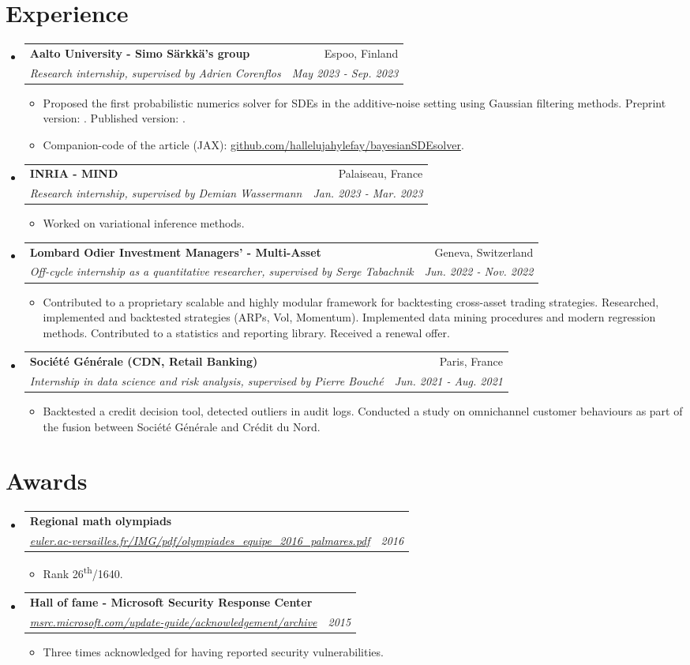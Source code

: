 \documentclass[letterpaper,10pt]{article}
\makeatletter
\newcommand{\up}[1]{\textsuperscript{#1}}
\newcommand{\resumeItem}[1]{
    \item\small{
            {#1 \vspace{-2pt}}
    }
}
\newcommand{\resumeSubheading}[4]{
    \vspace{-2pt}\item
    \begin{tabular*}{0.97\textwidth}[t]{l@{\extracolsep{\fill}}r}
        \textbf{#1}       & #2                 \\
        \textit{\small#3} & \textit{\small #4} \\
    \end{tabular*}\vspace{-7pt}
}
\newcommand{\resumeSubHeadingListStart}{\begin{itemize}[leftmargin=0.15in, label={}]}
\newcommand{\resumeSubHeadingListEnd}{\end{itemize}}
\newcommand{\resumeItemListStart}{\begin{itemize}}
\newcommand{\resumeItemListEnd}{\end{itemize}\vspace{-5pt}}
\makeatother
\begin{document}
\section{Experience}
\resumeSubHeadingListStart
\resumeSubheading
{Aalto University - Simo Särkkä's group}{Espoo, Finland}
{Research internship, supervised by Adrien Corenflos}{May 2023 - Sep. 2023}
\resumeItemListStart
\resumeItem{Proposed the first probabilistic numerics solver for SDEs in the additive-noise setting using Gaussian filtering methods. Preprint version: . Published version: .}
\resumeItem{Companion-code of the article (JAX): \href{https://github.com/hallelujahylefay/bayesianSDEsolver}{github.com/hallelujahylefay/bayesianSDEsolver}.}
\resumeItemListEnd
\resumeSubheading
{INRIA - MIND}{Palaiseau, France}
{Research internship, supervised by Demian Wassermann}{Jan. 2023 - Mar. 2023}
\resumeItemListStart
\resumeItem{Worked on variational inference methods.}
\resumeItemListEnd
\resumeSubheading
{Lombard Odier Investment Managers' - Multi-Asset}{Geneva, Switzerland}
{Off-cycle internship as a quantitative researcher, supervised by Serge Tabachnik}{Jun. 2022 - Nov. 2022}
\resumeItemListStart
\resumeItem{Contributed to a proprietary scalable and highly modular framework for backtesting cross-asset trading strategies. Researched, implemented and backtested strategies (ARPs, Vol, Momentum). Implemented data mining procedures and modern regression methods. Contributed to a statistics and reporting library. Received a renewal offer.}
\resumeItemListEnd
\resumeSubheading
{Société Générale (CDN, Retail Banking)}{Paris, France}%
{Internship in data science and risk analysis, supervised by Pierre Bouché}{Jun. 2021 - Aug. 2021}
\resumeItemListStart
\resumeItem{Backtested a credit decision tool, detected outliers in audit logs. Conducted a study on omnichannel customer behaviours as part of the fusion between Société Générale and Crédit du Nord.}
\resumeItemListEnd
\resumeSubHeadingListEnd
\section{Awards}
\resumeSubHeadingListStart
\resumeSubheading
{Regional math olympiads}{}{\href{http://euler.ac-versailles.fr/IMG/pdf/olympiades_equipe_2016_palmares.pdf}{euler.ac-versailles.fr/IMG/pdf/olympiades\_equipe\_2016\_palmares.pdf}}{2016}
\resumeItemListStart
\resumeItem{Rank 26\up{th}/1640.}
\resumeItemListEnd
\resumeSubheading
{Hall of fame - Microsoft Security Response Center}{}{\href{https://msrc.microsoft.com/update-guide/acknowledgement/archive}{msrc.microsoft.com/update-guide/acknowledgement/archive}}{2015}
\resumeItemListStart
\resumeItem{Three times acknowledged for having reported security vulnerabilities.}
\resumeItemListEnd
\resumeSubHeadingListEnd
\end{document}
